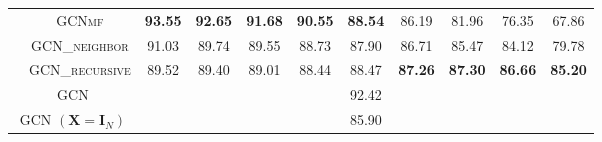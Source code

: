 \begin{table}[!p]
{\begin{tabular}{c|c|ccccccccc}
& \textsc{GCNmf} & \textbf{93.55} & \textbf{92.65} & \textbf{91.68} & \textbf{90.55} & \textbf{88.54} & 86.19 & 81.96 & 76.35 & 67.86\\ 
& \textsc{GCN\_neighbor} & 91.03 & 89.74 & 89.55 & 88.73 & 87.90 & 86.71 & 85.47 & 84.12 & 79.78 \\
& \textsc{GCN\_recursive} & 89.52 & 89.40 & 89.01 & 88.44 & 88.47 & \textbf{87.26} & \textbf{87.30} & \textbf{86.66} & \textbf{85.20} \\
\midrule
\multicolumn{2}{c|}{GCN}& \multicolumn{9}{c}{92.42}\\
\multicolumn{2}{c|}{GCN $(\mathbf{X} = \mathbf{I}_N)$}& \multicolumn{9}{c}{85.90}\\ 
\bottomrule
    \end{tabular}
    }
\end{table}

